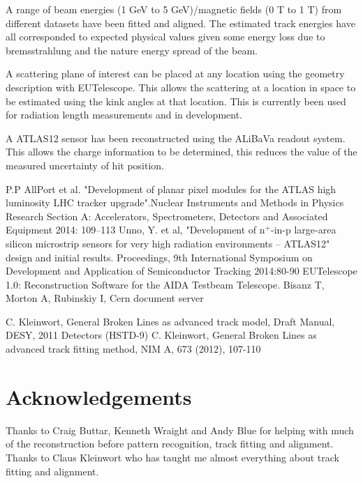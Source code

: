 \documentclass[a0,portrait]{a0poster}
\begin{document}
\begin{multicols}{2}
A range of beam energies (1 GeV to 5 GeV)/magnetic fields (0 T to 1 T) from different datasets have been fitted and aligned. The estimated track energies have all corresponded to expected physical values given some energy loss due to bremsstrahlung and the nature energy spread of the beam.

A scattering plane of interest can be placed at any location using the geometry description with EUTelescope. This allows the scattering at a location in space to be estimated using the kink angles at that location. This is currently been used for radiation length measurements and in development. 

A ATLAS12 sensor has been reconstructed using the ALiBaVa readout system. This allows the charge information to be determined, this reduces the value of the measured uncertainty of hit position. 

\begin{thebibliography}{9}
	 P.P AllPort et al. "Development of planar pixel modules for the ATLAS high luminosity LHC tracker upgrade".Nuclear Instruments and Methods in Physics Research Section A: Accelerators, Spectrometers, Detectors and Associated Equipment 2014: 109–113 
	 Unno, Y. et al, "Development of n$^+$-in-p large-area silicon microstrip sensors for very high radiation environments – ATLAS12" design and initial results. Proceedings, 9th International Symposium on Development and Application of Semiconductor Tracking 2014:80-90 
 EUTelescope 1.0: Reconstruction Software for the AIDA Testbeam Telescope. Bisanz T, Morton A, Rubinskiy I, Cern document server

	  C. Kleinwort, General Broken Lines as advanced track model, Draft Manual, DESY, 2011
                        Detectors (HSTD-9)
	  C. Kleinwort, General Broken Lines as advanced track fitting method, NIM A, 673 (2012), 107-110
\end{thebibliography}

\section*{Acknowledgements}
Thanks to Craig Buttar, Kenneth Wraight and Andy Blue for helping with much of the reconstruction before pattern recognition, track fitting and alignment. Thanks to Claus Kleinwort who has taught me almost everything about track fitting and alignment. 




\end{multicols}
\end{document}
